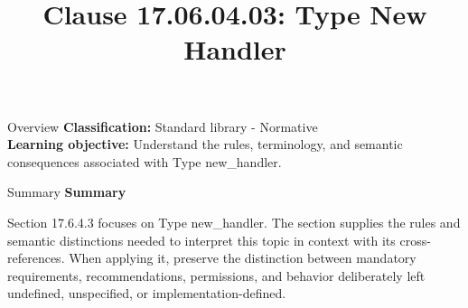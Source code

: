\documentclass[10pt,letterpaper]{article}
\title{Clause 17.06.04.03: Type New Handler}
\author{}
\date{}
\begin{document}
\maketitle
\begin{CornellOverviewBox}{Overview}
\textbf{Classification:} Standard library - Normative\\[2pt]
\textbf{Learning objective:} Understand the rules, terminology, and semantic consequences associated with Type new\_handler.
\end{CornellOverviewBox}\begin{CornellSummaryBox}{Summary}
{\sffamily\bfseries\color{Accent} Summary}\par\vspace{3pt}Section 17.6.4.3 focuses on Type new\_handler. The section supplies the rules and semantic distinctions needed to interpret this topic in context with its cross-references. When applying it, preserve the distinction between mandatory requirements, recommendations, permissions, and behavior deliberately left undefined, unspecified, or implementation-defined.
\end{CornellSummaryBox}
\end{document}
